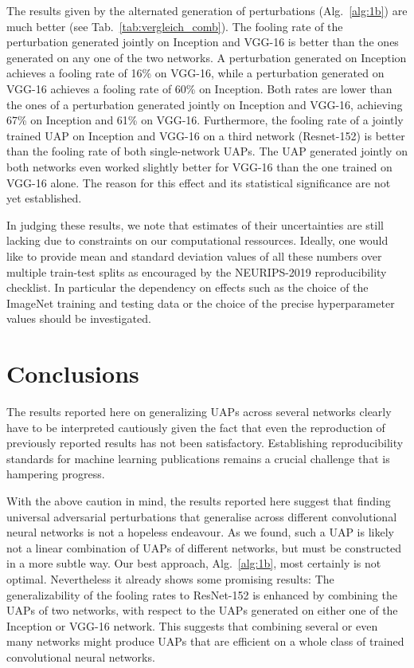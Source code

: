 \documentclass[runningheads]{llncs}
\begin{document}
The results given by the alternated generation of perturbations (Alg.~\ref{alg:1b}) are much better (see Tab.~\ref{tab:vergleich_comb}). The fooling rate of the perturbation generated jointly on Inception and VGG-16 is better than the ones generated on any one of the 
two networks. A perturbation generated on Inception achieves a fooling rate of 16\% on VGG-16, while a perturbation generated on VGG-16 achieves a fooling rate of 60\% on Inception. Both rates are lower than the ones of a perturbation generated jointly on Inception and VGG-16, achieving 67\% on Inception and 61\% on VGG-16. Furthermore, the fooling rate of a jointly trained UAP on Inception and VGG-16 on a third network (Resnet-152) is better than the fooling rate of both single-network UAPs. The UAP generated jointly on both networks even worked slightly better for VGG-16 than the one trained on VGG-16 alone. The reason for this effect and its statistical significance are not yet established. 

In judging these results, we note that estimates of their uncertainties are still lacking due to constraints on our computational ressources. Ideally, one would like to provide mean and standard deviation values of all these numbers over multiple train-test splits as encouraged by the NEURIPS-2019 reproducibility checklist. In particular the dependency on effects such as the choice of the ImageNet training and testing data or the choice of the precise hyperparameter values should be investigated. 

\section{Conclusions}\label{sec:conclusion}
The results reported here on generalizing UAPs across several networks clearly have to be interpreted cautiously given the fact that even the reproduction of previously reported results has not been satisfactory. Establishing reproducibility standards for machine learning publications remains a crucial challenge that is hampering progress.

With the above caution in mind, the results reported here suggest that finding universal adversarial perturbations that generalise across different convolutional neural networks is not a hopeless endeavour. As we found, such a UAP is likely not a linear combination of UAPs of different networks, but must be constructed in a more subtle way. Our best approach, Alg.~\ref{alg:1b}, most certainly is not optimal. Nevertheless it already shows some promising results: The generalizability of the fooling rates to ResNet-152 is enhanced by combining the UAPs of two networks, with respect to the UAPs generated on either one of the Inception or VGG-16 network. This suggests that combining several or even many networks might produce UAPs that are efficient on a whole class of trained 
convolutional neural networks.


\end{document}
